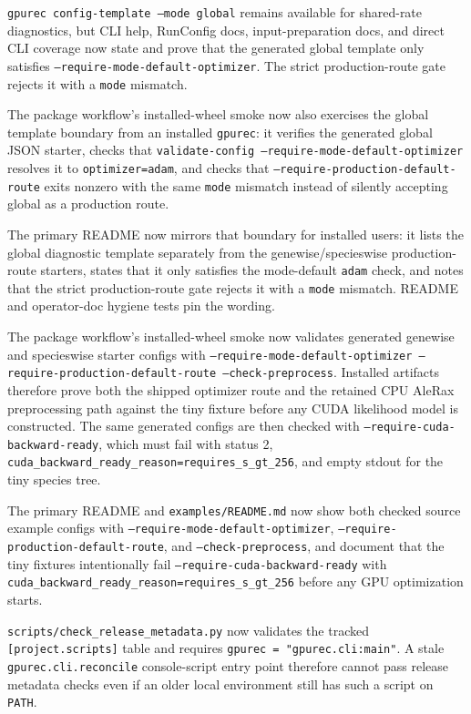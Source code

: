 \documentclass[11pt]{article}
\begin{document}
\texttt{gpurec config-template --mode global} remains available for shared-rate
diagnostics, but CLI help, RunConfig docs, input-preparation docs, and direct
CLI coverage now state and prove that the generated global template only
satisfies \texttt{--require-mode-default-optimizer}.  The strict
production-route gate rejects it with a \texttt{mode} mismatch.

The package workflow's installed-wheel smoke now also exercises the global
template boundary from an installed \texttt{gpurec}: it verifies the generated
global JSON starter, checks that \texttt{validate-config
--require-mode-default-optimizer} resolves it to \texttt{optimizer=adam}, and
checks that \texttt{--require-production-default-route} exits nonzero with the
same \texttt{mode} mismatch instead of silently accepting global as a production
route.

The primary README now mirrors that boundary for installed users: it lists the
global diagnostic template separately from the genewise/specieswise
production-route starters, states that it only satisfies the mode-default
\texttt{adam} check, and notes that the strict production-route gate rejects it
with a \texttt{mode} mismatch.  README and operator-doc hygiene tests pin the
wording.

The package workflow's installed-wheel smoke now validates generated genewise
and specieswise starter configs with
\texttt{--require-mode-default-optimizer --require-production-default-route
--check-preprocess}.  Installed artifacts therefore prove both the shipped
optimizer route and the retained CPU AleRax preprocessing path against the tiny
fixture before any CUDA likelihood model is constructed.  The same generated
configs are then checked with \texttt{--require-cuda-backward-ready}, which must
fail with status 2, \texttt{cuda_backward_ready_reason=requires_s_gt_256}, and
empty stdout for the tiny species tree.

The primary README and \texttt{examples/README.md} now show both checked source
example configs with \texttt{--require-mode-default-optimizer},
\texttt{--require-production-default-route}, and \texttt{--check-preprocess},
and document that the tiny fixtures intentionally fail
\texttt{--require-cuda-backward-ready} with
\texttt{cuda_backward_ready_reason=requires_s_gt_256} before any GPU
optimization starts.

\texttt{scripts/check_release_metadata.py} now validates the tracked
\texttt{[project.scripts]} table and requires
\texttt{gpurec = "gpurec.cli:main"}.  A stale
\texttt{gpurec.cli.reconcile} console-script entry point therefore cannot pass
release metadata checks even if an older local environment still has such a
script on \texttt{PATH}.
\end{document}
